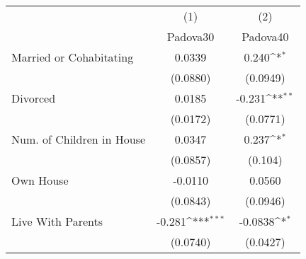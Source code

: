 {
\def\sym#1{\ifmmode^{#1}\else\(^{#1}\)\fi}
\begin{tabular}{l*{2}{c}}
\toprule
            &\multicolumn{1}{c}{(1)}&\multicolumn{1}{c}{(2)}\\
            &\multicolumn{1}{c}{Padova30}&\multicolumn{1}{c}{Padova40}\\
\midrule
Married or Cohabitating&      0.0339         &       0.240\sym{*}  \\
            &    (0.0880)         &    (0.0949)         \\
\addlinespace
Divorced    &      0.0185         &      -0.231\sym{**} \\
            &    (0.0172)         &    (0.0771)         \\
\addlinespace
Num. of Children in House&      0.0347         &       0.237\sym{*}  \\
            &    (0.0857)         &     (0.104)         \\
\addlinespace
Own House   &     -0.0110         &      0.0560         \\
            &    (0.0843)         &    (0.0946)         \\
\addlinespace
Live With Parents&      -0.281\sym{***}&     -0.0838\sym{*}  \\
            &    (0.0740)         &    (0.0427)         \\
\bottomrule
\end{tabular}
}
